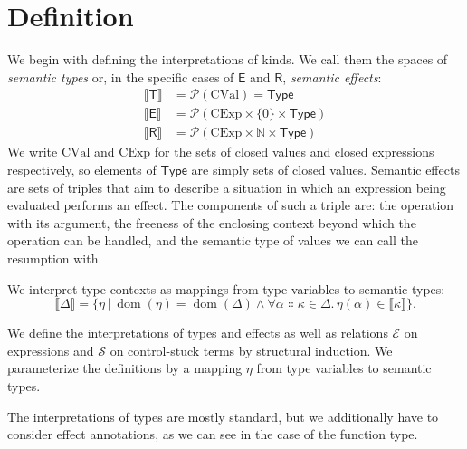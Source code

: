 \documentclass[a4paper, 12pt]{report}
\newcommand{\E}{\mathcal{E}}
\renewcommand{\S}{\mathcal{S}}
\newcommand{\kT}{\mathsf{T}}
\newcommand{\kE}{\mathsf{E}}
\newcommand{\kR}{\mathsf{R}}
\DeclareMathOperator{\dom}{dom}
\newcommand{\+}{\enspace}
\begin{document}
\section{Definition}

We begin with defining the interpretations of kinds.
We call them the spaces of \textit{semantic types} or,
in the specific cases of $\kE$ and $\kR$, \textit{semantic effects}:
\begin{align*}
	⟦\kT⟧ &= \mathcal{P}(\textrm{CVal}) = \mathsf{Type}\\
	⟦\kE⟧ &= \mathcal{P}(\textrm{CExp}×\{0\}×\mathsf{Type}) \\
	⟦\kR⟧ &= \mathcal{P}(\textrm{CExp}×ℕ×\mathsf{Type})
\end{align*}
We write $\textrm{CVal}$ and $\textrm{CExp}$ for the sets of closed values and closed expressions respectively, so
elements of $\mathsf{Type}$ are simply sets of closed values.
Semantic effects are sets of triples that aim to describe a situation
in which an expression being evaluated performs an effect.
The components of such a triple are:
the operation with its argument,
the freeness of the enclosing context beyond which the operation can be handled,
and the semantic type of values we can call the resumption with.

We interpret type contexts as mappings from type variables to semantic types:
$$⟦Δ⟧ = \{ η │ \dom(η) = \dom(Δ) ∧ ∀α∷κ∈Δ.\,η(α) ∈ ⟦κ⟧ \}.$$

We define the interpretations of types and effects as well as
relations $\E$ on expressions and $\S$ on control-stuck terms by structural induction.
We parameterize the definitions by a mapping $η$ from type variables to
semantic types.

The interpretations of types are mostly standard,
but we additionally have to consider effect annotations,
as we can see in the case of the function type.
\end{document}
